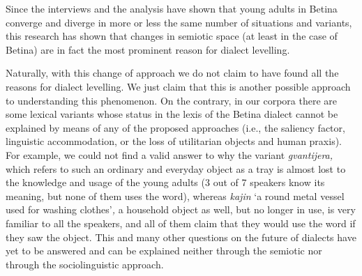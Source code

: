 \documentclass[output=paper]{LSP/langsci}
\begin{document}
Since the interviews and the analysis have shown that young adults in Betina converge and diverge in more or less the same number of situations and variants, this research has shown that changes in semiotic space (at least in the case of Betina) are in fact the most prominent reason for dialect levelling. 

Naturally, with this change of approach we do not claim to have found all the reasons for dialect levelling. We just claim that this is another possible approach to understanding this phenomenon. On the contrary, in our corpora there are some lexical variants whose status in the lexis of the Betina dialect cannot be explained by means of any of the proposed approaches (i.e., the saliency factor, linguistic accommodation, or the loss of utilitarian objects and human praxis). For example, we could not find a valid answer to why the variant \textit{gvantijera, }which refers to such an ordinary and everyday object as a tray is almost lost to the knowledge and usage of the young adults (3 out of 7 speakers know its meaning, but none of them uses the word), whereas \textit{kajin }‘a round metal vessel used for washing clothes’\textit{, }a household object as well, but no longer in use, is very familiar to all the speakers, and all of them claim that they would use the word if they saw the object. This and many other questions on the future of dialects have yet to be answered and can be explained neither through the semiotic nor through the sociolinguistic approach.

\printbibliography[heading=subbibliography,notkeyword=this]
\end{document}
